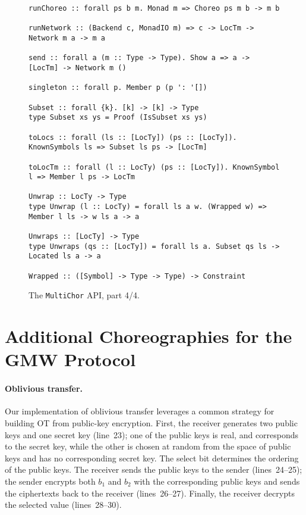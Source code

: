 \documentclass[sigplan,screen]{acmart}
\newcommand{\MultiChor}{\texttt{Multi\-Chor}\xspace}
\begin{document}
\begin{figure*}\ContinuedFloat
\begin{mdframed}
\begin{verbatim}
runChoreo :: forall ps b m. Monad m => Choreo ps m b -> m b

runNetwork :: (Backend c, MonadIO m) => c -> LocTm -> Network m a -> m a

send :: forall a (m :: Type -> Type). Show a => a -> [LocTm] -> Network m ()

singleton :: forall p. Member p (p ': '[])

Subset :: forall {k}. [k] -> [k] -> Type
type Subset xs ys = Proof (IsSubset xs ys)

toLocs :: forall (ls :: [LocTy]) (ps :: [LocTy]). KnownSymbols ls => Subset ls ps -> [LocTm]

toLocTm :: forall (l :: LocTy) (ps :: [LocTy]). KnownSymbol l => Member l ps -> LocTm

Unwrap :: LocTy -> Type
type Unwrap (l :: LocTy) = forall ls a w. (Wrapped w) => Member l ls -> w ls a -> a

Unwraps :: [LocTy] -> Type
type Unwraps (qs :: [LocTy]) = forall ls a. Subset qs ls -> Located ls a -> a

Wrapped :: ([Symbol] -> Type -> Type) -> Constraint
\end{verbatim}
\caption{The \MultiChor API, part 4/4.}
\end{mdframed}
\end{figure*}



\section{Additional Choreographies for the GMW Protocol}
\label{sec:gmw_appendix}

\paragraph{Oblivious transfer.}
Our implementation of oblivious transfer leverages a common strategy for building OT from public-key encryption. First, the receiver generates two public keys and one secret key (line~23); one of the public keys is real, and corresponds to the secret key, while the other is chosen at random from the space of public keys and has no corresponding secret key. The select bit determines the ordering of the public keys. The receiver sends the public keys to the sender (lines~24--25); the sender encrypts both $b_1$ and $b_2$ with the corresponding public keys and sends the ciphertexts back to the receiver (lines~26--27). Finally, the receiver decrypts the selected value (lines~28--30).
\end{document}
